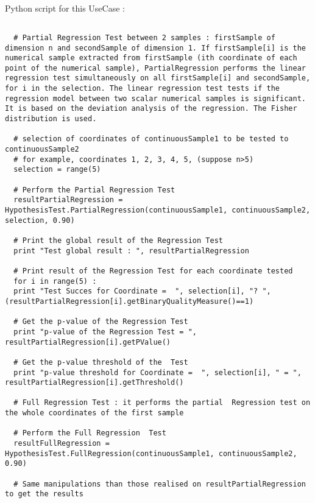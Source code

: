 \textspace\\
Python script for this UseCase :

\begin{lstlisting}

  # Partial Regression Test between 2 samples : firstSample of dimension n and secondSample of dimension 1. If firstSample[i] is the numerical sample extracted from firstSample (ith coordinate of each point of the numerical sample), PartialRegression performs the linear regression test simultaneously on all firstSample[i] and secondSample, for i in the selection. The linear regression test tests if the regression model between two scalar numerical samples is significant. It is based on the deviation analysis of the regression. The Fisher distribution is used.

  # selection of coordinates of continuousSample1 to be tested to continuousSample2
  # for example, coordinates 1, 2, 3, 4, 5, (suppose n>5)
  selection = range(5)

  # Perform the Partial Regression Test
  resultPartialRegression = HypothesisTest.PartialRegression(continuousSample1, continuousSample2, selection, 0.90)

  # Print the global result of the Regression Test
  print "Test global result : ", resultPartialRegression

  # Print result of the Regression Test for each coordinate tested
  for i in range(5) :
  print "Test Succes for Coordinate =  ", selection[i], "? ", (resultPartialRegression[i].getBinaryQualityMeasure()==1)

  # Get the p-value of the Regression Test
  print "p-value of the Regression Test = ", resultPartialRegression[i].getPValue()

  # Get the p-value threshold of the  Test
  print "p-value threshold for Coordinate =  ", selection[i], " = ", resultPartialRegression[i].getThreshold()

  # Full Regression Test : it performs the partial  Regression test on the whole coordinates of the first sample

  # Perform the Full Regression  Test
  resultFullRegression = HypothesisTest.FullRegression(continuousSample1, continuousSample2, 0.90)

  # Same manipulations than those realised on resultPartialRegression to get the results
\end{lstlisting}


